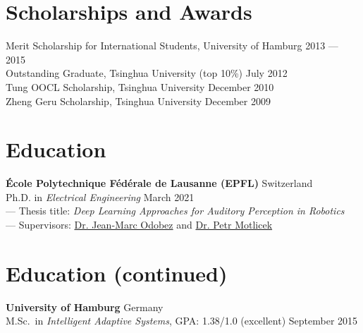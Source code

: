 \documentclass[a4paper,9pt]{extarticle} %
\newcommand{\ind}{\hspace*{1em}}
\begin{document}

\section{Scholarships and Awards}

Merit Scholarship for International Students, University of Hamburg \hfill 2013 --- 2015 \\
Outstanding Graduate, Tsinghua University (top 10\%) \hfill July 2012 \\
Tung OOCL Scholarship, Tsinghua University \hfill December 2010  \\
Zheng Geru Scholarship, Tsinghua University \hfill December 2009

\fi


\section{Education}
\parbox{\textwidth}{%
\textbf{\'Ecole Polytechnique F\'ed\'erale de Lausanne (EPFL)} \hfill Switzerland \\
\ind{} Ph.D. in \textit{Electrical Engineering} \hfill March 2021 \\
\ind{} --- Thesis title: \textit{Deep Learning Approaches for Auditory Perception in Robotics} \\
\ind{} --- Supervisors: \href{https://idiap.ch/~odobez}{Dr. Jean-Marc Odobez} and \href{https://people.idiap.ch/pmotlic}{Dr. Petr Motlicek}
}

\pagebreak
\section*{Education (continued)}

\parbox{\textwidth}{%
\textbf{University of Hamburg} \hfill Germany \\
\ind{} M.Sc.\ in \textit{Intelligent Adaptive Systems}, GPA\@: 1.38/1.0 (excellent)  \hfill September 2015%
}
\end{document}
